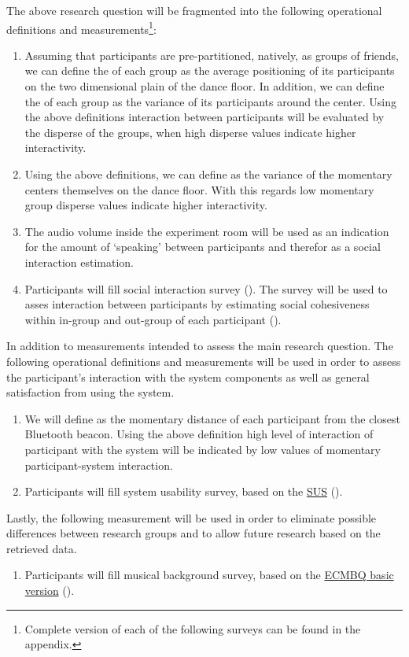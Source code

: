 The above research question will be fragmented into the following operational definitions and measurements\footnote{Complete version of each of the following surveys can be found in the appendix.}:
\begin{enumerate}
	\item \label{measure:disperse} Assuming that participants are pre-partitioned, natively, as groups of friends, we can define the  of each group as the average positioning of its participants on the two dimensional plain of the dance floor. In addition, we can define the  of each group as the variance of its participants around the center. Using the above definitions interaction between participants will be evaluated by the disperse of the groups, when high disperse values indicate higher interactivity.
	\item \label{measure:groups} Using the above definitions, we can define  as the variance of the momentary centers themselves on the dance floor. With this regards low momentary group disperse values indicate higher interactivity.
	\item \label{measure:audio} The audio volume inside the experiment room will be used as an indication for the amount of `speaking' between participants and therefor as a social interaction estimation.
	\item \label{measure:survey:social} Participants will fill social interaction survey (). The survey will be used to asses interaction between participants by estimating social cohesiveness within in-group and out-group of each participant ().
\end{enumerate}
In addition to measurements intended to assess the main research question. The following operational definitions and measurements will be used in order to assess the participant's interaction with the system components as well as general satisfaction from using the system.
\begin{enumerate}[resume]
	\item \label{measure:system} We will define  as the momentary distance of each participant from the closest Bluetooth beacon. Using the above definition high level of interaction of participant with the system will be indicated by low values of momentary participant-system interaction.
	\item \label{measure:survey:usability} Participants will fill system usability survey, based on the \href{http://en.wikipedia.org/wiki/System_usability_scale}{SUS} ().
\end{enumerate}
Lastly, the following measurement will be used in order to eliminate possible differences between research groups and to allow future research based on the retrieved data.
\begin{enumerate}[resume]
	\item \label{measure:survey:musical} Participants will fill musical background survey, based on the \href{sites.google.com/site/ecmbqzhao1/simple%20questionnaire.pdf}{ECMBQ basic version} (\todo{finish ref}).
\end{enumerate}

